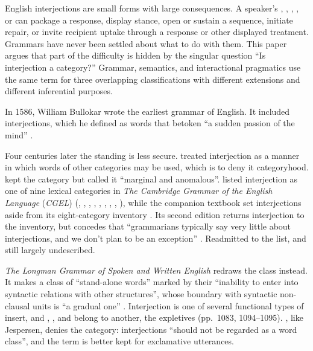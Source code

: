 \documentclass[12pt]{article}
\begin{document}
English interjections are small forms with large consequences. A
speaker's , , , , or
 can package a response, display stance, open or sustain a
sequence, initiate repair, or invite recipient uptake through a response or
other displayed treatment. Grammars have never been
settled about what to do with them. This paper argues that part of the
difficulty is hidden by the singular question \enquote{Is interjection a
category?} Grammar, semantics, and interactional pragmatics use the same term
for three overlapping classifications with different extensions and
different inferential purposes.

In 1586, William Bullokar wrote the earliest grammar of English. It
included interjections, which he defined as words that betoken
\enquote{a sudden passion of the mind} \citep[373]{bullokar1586}.

Four centuries later the standing is less secure.
\textcite[90]{jespersen1924} treated interjection as a manner in which
words of other categories may be used, which is to deny it categoryhood.
\textcite[67]{quirk1985} kept the category but called it
\enquote{marginal and anomalous}.
\textcite[22]{HuddlestonPullum2002} listed interjection as one of nine
lexical categories in \textit{The Cambridge Grammar of the English
Language} (\textit{CGEL}) (,
, , , ,
, , , ), while the
companion textbook set interjections aside from its eight-category
inventory \citep[16]{HuddlestonPullum2005}. Its second
edition returns interjection to the inventory, but concedes that
\enquote{grammarians typically say very little about interjections, and
we don't plan to be an exception} \citep[24]{HuddlestonPullumReynolds2022}.
Readmitted to the list, and still largely undescribed.

\textit{The Longman Grammar of Spoken and Written English} redraws the class
instead. It makes  a class of \enquote{stand-alone words} marked
by their \enquote{inability to enter into syntactic relations with other
structures}, whose boundary with syntactic non-clausal units is
\enquote{a gradual one} \citep[1082]{Biber1999}. Interjection is one of several
functional types of insert, and , , and
 belong to another, the expletives (pp.~1083, 1094--1095).
\textcite[81, 83]{ljung2011}, like Jespersen, denies the category: interjections
\enquote{should not be regarded as a word class}, and the term is better kept
for exclamative utterances.
\end{document}
